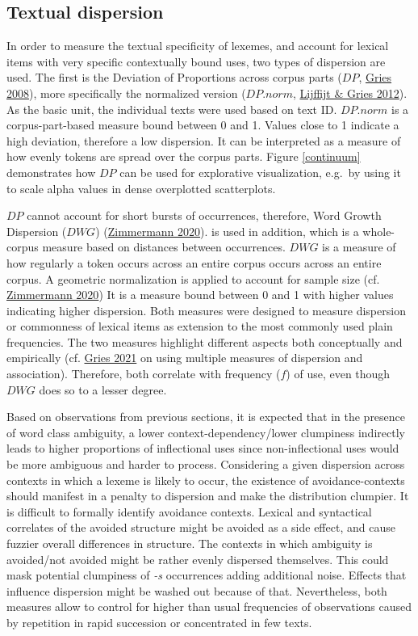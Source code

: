 \documentclass[
]{article}
\begin{document}
\hypertarget{disp}{%
\subsection{Textual dispersion}\label{disp}}

In order to measure the textual specificity of lexemes, and account for
lexical items with very specific contextually bound uses, two types of
dispersion are used. The first is the Deviation of Proportions across
corpus parts (\(DP\), \protect\hyperlink{ref-gries08}{Gries 2008}), more
specifically the normalized version (\(DP.norm\),
\protect\hyperlink{ref-lijffijt+gries12}{Lijffijt \& Gries 2012}). As
the basic unit, the individual texts were used based on text ID.
\(DP.norm\) is a corpus-part-based measure bound between 0 and 1. Values
close to 1 indicate a high deviation, therefore a low dispersion. It can
be interpreted as a measure of how evenly tokens are spread over the
corpus parts. Figure \ref{continuum} demonstrates how \(DP\) can be used
for explorative visualization, e.g.~by using it to scale alpha values in
dense overplotted scatterplots.

\(DP\) cannot account for short bursts of occurrences, therefore, Word
Growth Dispersion (\(DWG\))
(\protect\hyperlink{ref-zimmermann20}{Zimmermann 2020}). is used in
addition, which is a whole-corpus measure based on distances between
occurrences. \(DWG\) is a measure of how regularly a token occurs across
an entire corpus occurs across an entire corpus. A geometric
normalization is applied to account for sample size (cf.
\protect\hyperlink{ref-zimmermann20}{Zimmermann 2020}) It is a measure
bound between 0 and 1 with higher values indicating higher dispersion.
Both measures were designed to measure dispersion or commonness of
lexical items as extension to the most commonly used plain frequencies.
The two measures highlight different aspects both conceptually and
empirically (cf. \protect\hyperlink{ref-gries21}{Gries 2021} on using
multiple measures of dispersion and association). Therefore, both
correlate with frequency (\(f\)) of use, even though \(DWG\) does so to
a lesser degree.

Based on observations from previous sections, it is expected that in the
presence of word class ambiguity, a lower context-dependency/lower
clumpiness indirectly leads to higher proportions of inflectional uses
since non-inflectional uses would be more ambiguous and harder to
process. Considering a given dispersion across contexts in which a
lexeme is likely to occur, the existence of avoidance-contexts should
manifest in a penalty to dispersion and make the distribution clumpier.
It is difficult to formally identify avoidance contexts. Lexical and
syntactical correlates of the avoided structure might be avoided as a
side effect, and cause fuzzier overall differences in structure. The
contexts in which ambiguity is avoided/not avoided might be rather
evenly dispersed themselves. This could mask potential clumpiness of
\emph{-s} occurrences adding additional noise. Effects that influence
dispersion might be washed out because of that. Nevertheless, both
measures allow to control for higher than usual frequencies of
observations caused by repetition in rapid succession or concentrated in
few texts.
\end{document}
